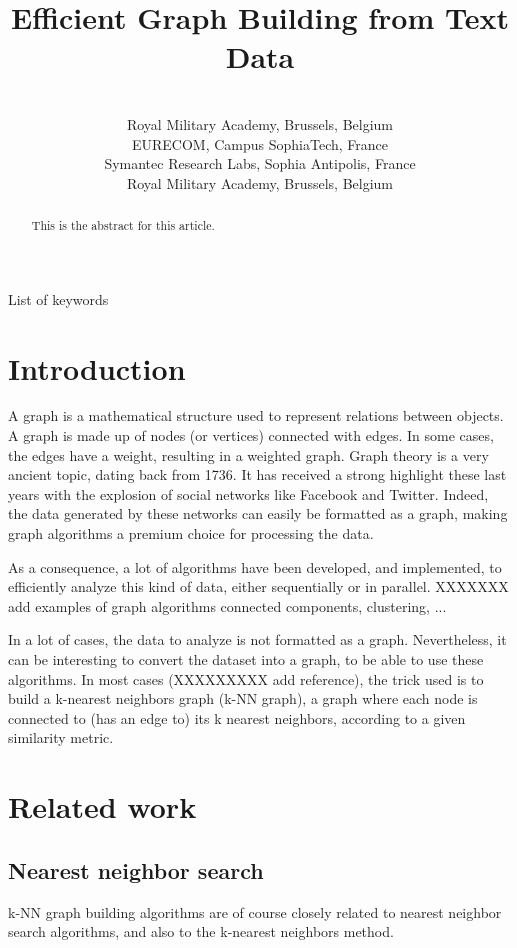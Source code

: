 \documentclass[wcp]{jmlr}
\title[Short Title]{Efficient Graph Building from Text Data}
\author{\Name{Thibault Debatty} \Email{thibault.debatty@rma.ac.be}\\
  \addr Royal Military Academy, Brussels, Belgium
  \AND
  \Name{Pietro Michiardi} \Email{pietro.michiardi@eurecom.fr}\\
  \addr EURECOM, Campus SophiaTech, France
  \AND
  \Name{Olivier Thonnard} \Email{olivier\_thonnard@symantec.com}\\
  \addr Symantec Research Labs, Sophia Antipolis, France
  \AND
  \Name{Wim Mees} \Email{wim.mees@rma.ac.be}\\
  \addr Royal Military Academy, Brussels, Belgium
 }
\begin{document}
\maketitle

\begin{abstract}
This is the abstract for this article.
\end{abstract}

\begin{keywords}
List of keywords
\end{keywords}

\section{Introduction}
A graph is a mathematical structure used to represent relations between objects. A graph is made up of nodes (or vertices) connected with edges. In some cases, the edges have a weight, resulting in a weighted graph. Graph theory is a very ancient topic, dating back from 1736. %
It has received a strong highlight these last years with the explosion of social networks like Facebook and Twitter. Indeed, the data generated by these networks can easily be formatted as a graph, making graph algorithms a premium choice for processing the data.

As a consequence, a lot of algorithms have been developed, and implemented, to efficiently analyze this kind of data, either sequentially or in parallel. XXXXXXX add examples of graph algorithms connected components, clustering, ...

In a lot of cases, the data to analyze is not formatted as a graph. Nevertheless, it can be interesting to convert the dataset into a graph, to be able to use these algorithms. In most cases (XXXXXXXXX add reference), the trick used is to build a k-nearest neighbors graph (k-NN graph), a graph where each node is connected to (has an edge to) its k nearest neighbors, according to a given similarity metric.

\section{Related work}

\subsection{Nearest neighbor search}
k-NN graph building algorithms are of course closely related to nearest neighbor search algorithms, and also to the k-nearest neighbors method.
\end{document}

